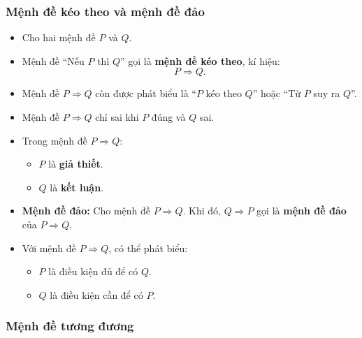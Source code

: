 \subsubsection{Mệnh đề kéo theo và mệnh đề đảo}


\begin{kienthuc}
\begin{itemize}
	\item Cho hai mệnh đề $P$ và $Q$.
	
	\item Mệnh đề ``Nếu $P$ thì $Q$'' gọi là \textbf{mệnh đề kéo theo}, kí hiệu:
	\[
	P\Rightarrow Q.
	\]
	
	\item Mệnh đề $P\Rightarrow Q$ còn được phát biểu là ``$P$ kéo theo $Q$'' hoặc ``Từ $P$ suy ra $Q$''.
	
	\item Mệnh đề $P\Rightarrow Q$ chỉ sai khi $P$ đúng và $Q$ sai.
	
	\item Trong mệnh đề $P\Rightarrow Q$:
	\begin{itemize}
		\item $P$ là \textbf{giả thiết}.
		\item $Q$ là \textbf{kết luận}.
	\end{itemize}
	
	\item \textbf{Mệnh đề đảo:} Cho mệnh đề $P\Rightarrow Q$. Khi đó, $Q\Rightarrow P$ gọi là \textbf{mệnh đề đảo} của $P\Rightarrow Q$.
\end{itemize}
\end{kienthuc}

\begin{emcothe}
\begin{itemize}
	\item Với mệnh đề $P\Rightarrow Q$, có thể phát biểu:
	\begin{itemize}
		\item $P$ là điều kiện đủ để có $Q$.
		\item $Q$ là điều kiện cần để có $P$.
	\end{itemize}
\end{itemize}
\end{emcothe}

\subsubsection{Mệnh đề tương đương}


